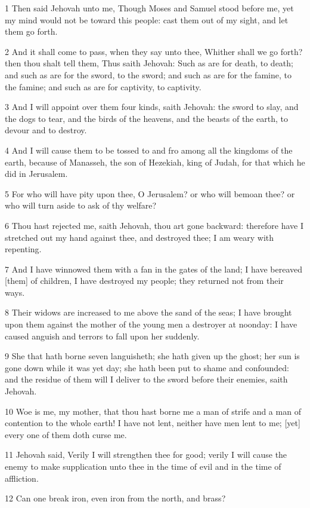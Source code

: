 \par 1 Then said Jehovah unto me, Though Moses and Samuel stood before me, yet my mind would not be toward this people: cast them out of my sight, and let them go forth.
\par 2 And it shall come to pass, when they say unto thee, Whither shall we go forth? then thou shalt tell them, Thus saith Jehovah: Such as are for death, to death; and such as are for the sword, to the sword; and such as are for the famine, to the famine; and such as are for captivity, to captivity.
\par 3 And I will appoint over them four kinds, saith Jehovah: the sword to slay, and the dogs to tear, and the birds of the heavens, and the beasts of the earth, to devour and to destroy.
\par 4 And I will cause them to be tossed to and fro among all the kingdoms of the earth, because of Manasseh, the son of Hezekiah, king of Judah, for that which he did in Jerusalem.
\par 5 For who will have pity upon thee, O Jerusalem? or who will bemoan thee? or who will turn aside to ask of thy welfare?
\par 6 Thou hast rejected me, saith Jehovah, thou art gone backward: therefore have I stretched out my hand against thee, and destroyed thee; I am weary with repenting.
\par 7 And I have winnowed them with a fan in the gates of the land; I have bereaved [them] of children, I have destroyed my people; they returned not from their ways.
\par 8 Their widows are increased to me above the sand of the seas; I have brought upon them against the mother of the young men a destroyer at noonday: I have caused anguish and terrors to fall upon her suddenly.
\par 9 She that hath borne seven languisheth; she hath given up the ghost; her sun is gone down while it was yet day; she hath been put to shame and confounded: and the residue of them will I deliver to the sword before their enemies, saith Jehovah.
\par 10 Woe is me, my mother, that thou hast borne me a man of strife and a man of contention to the whole earth! I have not lent, neither have men lent to me; [yet] every one of them doth curse me.
\par 11 Jehovah said, Verily I will strengthen thee for good; verily I will cause the enemy to make supplication unto thee in the time of evil and in the time of affliction.
\par 12 Can one break iron, even iron from the north, and brass?
